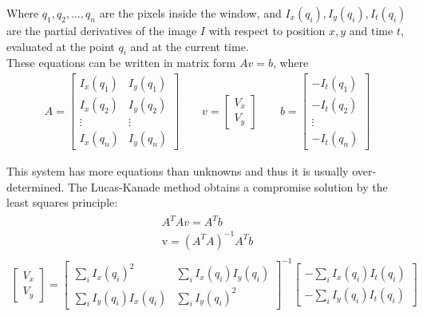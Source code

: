 Where $q_{1},q_{2},\dots ,q_{n}$ are the pixels inside the window, and $I_{x}(q_{i}),I_{y}(q_{i}),I_{t}(q_{i})$ are the partial derivatives of the image $I$ with respect to position $x, y$ and time $t$, evaluated at the point $q_{i}$ and at the current time.\\
These equations can be written in matrix form $Av=b$, where
\begin{align}
A={\begin{bmatrix}I_{x}(q_{1})&I_{y}(q_{1})\\[10pt]I_{x}(q_{2})&I_{y}(q_{2})\\[10pt]\vdots &\vdots \\[10pt]I_{x}(q_{n})&I_{y}(q_{n})\end{bmatrix}} \quad \quad v={\begin{bmatrix}V_{x}\\[10pt]V_{y}\end{bmatrix}} \quad \quad b={\begin{bmatrix}-I_{t}(q_{1})\\[10pt]-I_{t}(q_{2})\\[10pt]\vdots \\[10pt]-I_{t}(q_{n})\end{bmatrix}}
\end{align}

This system has more equations than unknowns and thus it is usually over-determined. The Lucas-Kanade method obtains a compromise solution by the least squares principle:
\begin{align}
\begin{split}
A^{T}Av=A^{T}b\\[10pt]
{\mathrm  {v}}=(A^{T}A)^{{-1}}A^{T}b
\end{split}
\end{align}
\begin{align}
{\begin{bmatrix}
V_{x}\\[10pt]
V_{y}\end{bmatrix}}
=
{\begin{bmatrix}
\sum _{i}I_{x}(q_{i})^{2}&\sum _{i}I_{x}(q_{i})I_{y}(q_{i})\\[10pt]
\sum _{i}I_{y}(q_{i})I_{x}(q_{i})&\sum _{i}I_{y}(q_{i})^{2}
\end{bmatrix}}^{{-1}}
{\begin{bmatrix}
-\sum _{i}I_{x}(q_{i})I_{t}(q_{i})\\[10pt]
-\sum _{i}I_{y}(q_{i})I_{t}(q_{i})
\end{bmatrix}}
\end{align}


